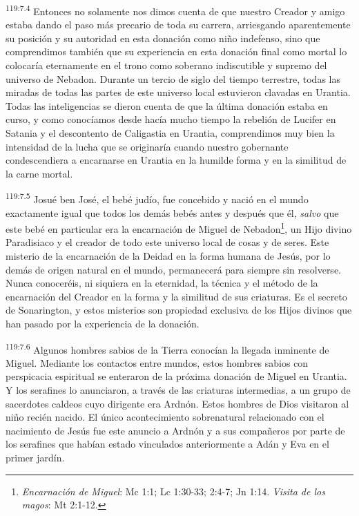 \par
\textsuperscript{119:7.4} Entonces no solamente nos dimos cuenta de que nuestro Creador y amigo estaba dando el paso más precario de toda su carrera, arriesgando aparentemente su posición y su autoridad en esta donación como niño indefenso, sino que comprendimos también que su experiencia en esta donación final como mortal lo colocaría eternamente en el trono como soberano indiscutible y supremo del universo de Nebadon. Durante un tercio de siglo del tiempo terrestre, todas las miradas de todas las partes de este universo local estuvieron clavadas en Urantia. Todas las inteligencias se dieron cuenta de que la última donación estaba en curso, y como conocíamos desde hacía mucho tiempo la rebelión de Lucifer en Satania y el descontento de Caligastia en Urantia, comprendimos muy bien la intensidad de la lucha que se originaría cuando nuestro gobernante condescendiera a encarnarse en Urantia en la humilde forma y en la similitud de la carne mortal.

\par
\textsuperscript{119:7.5} Josué ben José, el bebé judío, fue concebido y nació en el mundo exactamente igual que todos los demás bebés antes y después que él, \textit{salvo} que este bebé en particular era la encarnación de Miguel de Nebadon\footnote{\textit{Encarnación de Miguel}: Mc 1:1; Lc 1:30-33; 2:4-7; Jn 1:14. \textit{Visita de los magos}: Mt 2:1-12.}, un Hijo divino Paradisiaco y el creador de todo este universo local de cosas y de seres. Este misterio de la encarnación de la Deidad en la forma humana de Jesús, por lo demás de origen natural en el mundo, permanecerá para siempre sin resolverse. Nunca conoceréis, ni siquiera en la eternidad, la técnica y el método de la encarnación del Creador en la forma y la similitud de sus criaturas. Es el secreto de Sonarington, y estos misterios son propiedad exclusiva de los Hijos divinos que han pasado por la experiencia de la donación.

\par
\textsuperscript{119:7.6} Algunos hombres sabios de la Tierra conocían la llegada inminente de Miguel. Mediante los contactos entre mundos, estos hombres sabios con perspicacia espiritual se enteraron de la próxima donación de Miguel en Urantia. Y los serafines lo anunciaron, a través de las criaturas intermedias, a un grupo de sacerdotes caldeos cuyo dirigente era Ardnón. Estos hombres de Dios visitaron al niño recién nacido. El único acontecimiento sobrenatural relacionado con el nacimiento de Jesús fue este anuncio a Ardnón y a sus compañeros por parte de los serafines que habían estado vinculados anteriormente a Adán y Eva en el primer jardín.

